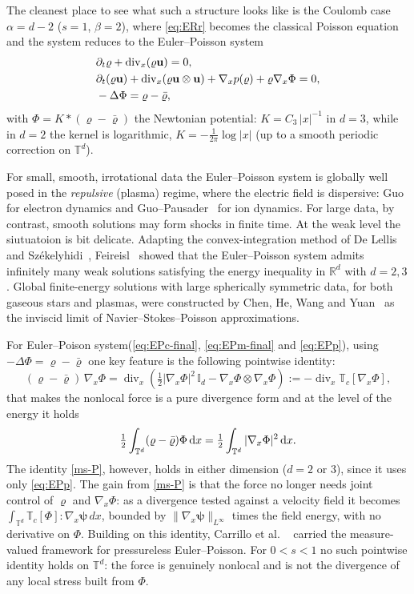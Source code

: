 \documentclass[12pt,a4paper,twoside]{article}
\newcommand{\Div}{\operatorname{div}}
\newcommand{\vr}{\varrho}
\newcommand{\vu}{\vc{u}}
\newcommand{\vc}[1]{{\bf #1}}
\newcommand{\Grad}{\nabla}
\newcommand{\dx}{{\,\rm d} {x}}
\newcommand{\R}{\mathbb{R}}
\numberwithin{equation}{section}%
\begin{document}
	The cleanest place to see what such a structure looks like is the Coulomb case
	$\alpha=d-2$ ($s=1$, $\beta=2$), where \eqref{eq:ERr} becomes the classical Poisson equation
	and the system reduces to the Euler--Poisson system
	\begin{align}
		& \partial_t \vr + \Div_x( \vr \vu ) = 0, \label{eq:EPc-final}\\
		& \partial_t(\vr \vu) + \Div_x (\vr \vu \otimes \vu ) + \Grad_x p(\vr) + \vr \Grad_x \Phi = 0,\label{eq:EPm-final} \\
		& -\Delta \Phi = \vr - \bar{\vr}, \label{eq:EPp}
	\end{align}
	with $\Phi=K\ast(\vr-\bar\vr)$ the Newtonian potential: $K=C_{3}\,|x|^{-1}$ in $d=3$, while
	in $d=2$ the kernel is logarithmic, $K=-\tfrac{1}{2\pi}\log|x|$ (up to a smooth periodic
	correction on $\mathbb T^d$). \par 
	For small, smooth, irrotational data the Euler--Poisson
	system is globally well posed in the \emph{repulsive} (plasma) regime, where the electric
	field is dispersive: Guo~\cite{G1998} for electron dynamics and Guo--Pausader~\cite{GP2011}
	for ion dynamics. For large data, by contrast, smooth solutions may form shocks in finite
	time. At the weak level the siutuatoion is bit delicate. Adapting the
	convex-integration method of De Lellis and Sz\'ekelyhidi~\cite{DS2009}, Feireisl~\cite{F2016b}
	showed that the Euler--Poisson system admits infinitely many weak solutions satisfying the energy inequality in $\R^d$ with $d=2,3$. Global finite-energy solutions with large spherically symmetric data, for both gaseous stars and plasmas, were constructed by Chen, He, Wang and Yuan~\cite{CHWY2024} as the inviscid limit of Navier--Stokes--Poisson approximations.
	
	
	For Euler--Poison system(\eqref{eq:EPc-final}, \eqref{eq:EPm-final} and \eqref{eq:EPp}), using $-\Delta\Phi = \vr-\bar\vr$ one key feature is the following pointwise identity:
	\begin{equation}\label{ms-P}
		(\vr-\bar\vr)\,\Grad_x\Phi
		= \Div_x\!\left( \tfrac12 |\Grad_x\Phi|^2\,\mathbb{I}_d - \Grad_x\Phi\otimes\Grad_x\Phi \right):=-\Div_x \mathbb{T}_{c}[\Grad_x \Phi],
	\end{equation}
	that makes the nonlocal force is a pure divergence form and at the level of the energy it holds
	\begin{align*}
		\tfrac12\int_{\mathbb T^d}(\vr-\bar\vr)\Phi \dx =\tfrac12\int_{\mathbb T^d}|\Grad_x\Phi|^2 \dx .
	\end{align*}
	The identity \eqref{ms-P}, however, holds in either
	dimension ($d=2 \text{ or } 3$), since it uses only \eqref{eq:EPp}.
	The gain from \eqref{ms-P} is that the force no longer needs joint control of $\vr$ and $\Grad_x\Phi$: as a
	divergence tested against a velocity field it becomes
	$\int_{\mathbb T^d}\mathbb T_c[\Phi]:\Grad_x\pmb\psi\,dx$, bounded by
	$\|\Grad_x\pmb\psi\|_{L^\infty}$ times the field energy, with no derivative on $\Phi$.
	Building on this identity, Carrillo et al. ~\cite{CDGS2024} carried the
	measure-valued framework for pressureless Euler--Poisson.	For $0<s<1$ no such pointwise identity holds on $\mathbb T^d$: the force is genuinely nonlocal
	and is not the divergence of any local stress built from $\Phi$.
	\medskip
\end{document}
